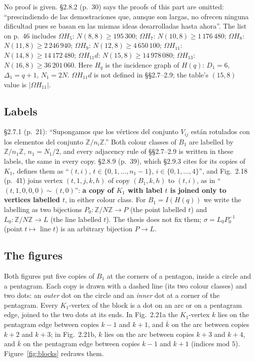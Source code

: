\documentclass[11pt]{amsart}
\theoremstyle{plain}
\theoremstyle{definition}
\theoremstyle{remark}
\newcommand{\bk}[1]{\overline{#1}}
\newcommand{\Om}{\Omega}
\newcommand{\pP}{P}  %
\newcommand{\lL}{L}  %
\begin{document}
No proof is given. \S2.8.2 (p.~30) says the proofs of this part are omitted: ``prescindiendo de las demostraciones que,
aunque son largas, no ofrecen ninguna dificultad pues se basan en las mismas ideas desarrolladas hasta ahora''. The list
on p.~46 includes $\Om H_5$: $N(8,8) \ge 195\,300$; $\Om H_7$: $N(10,8) \ge 1\,176\,480$; $\Om H_8$:
$N(11,8) \ge 2\,246\,940$; $\Om H_9$: $N(12,8) \ge 4\,650\,100$; $\Om H_{11}$: $N(14,8) \ge 14\,172\,480$;
$\Om H_{11}d$: $N(15,8) \ge 14\,978\,080$; $\Om H_{13}$: $N(16,8) \ge 36\,201\,060$. Here $H_q$ is the incidence graph
of $H(q)$: $D_1 = 6$, $\Delta_1 = q+1$, $N_1 = 2N$. $\Om H_{11}d$ is not defined in \S\S2.7--2.9; the table's $(15,8)$
value is $|\Om H_{11}|$.

\subsection{Labels}
\S2.7.1 (p.~21): ``Supongamos que los vértices del conjunto $V_{ij}$ están rotulados con los elementos del conjunto
$\mathbb{Z}/n_i\mathbb{Z}$.'' Both colour classes of $B_1$ are labelled by $\mathbb{Z}/n_1\mathbb{Z}$, $n_1 = N_1/2$, and
every adjacency rule of \S\S2.7--2.9 is written in these labels, the same in every copy. \S2.8.9 (p.~39), which
\S2.9.3 cites for its copies of $K_1$, defines them as ``$(t,i)$, $t \in \{0, 1, \dots, n_1 - 1\}$,
$i \in \{0, 1, \dots, 4\}$'', and Fig.~2.18 (p.~41) joins vertex $(t,1,j,k,h)$ of copy $(B_1,k,h)$ to $(t,i)$, as in
``$(t,1,0,0,0) \sim (t,0)$'': \textbf{a copy of $K_1$ with label $t$ is joined only to vertices labelled $t$}, in either
colour class. For $B_1 = I(H(q))$ we write the labelling as two bijections $P_0\colon \mathbb{Z}/N\mathbb{Z} \to \pP$ (the
point labelled $t$) and $L_0\colon \mathbb{Z}/N\mathbb{Z} \to \lL$ (the line labelled $t$). The thesis does not fix them;
$\sigma = L_0P_0^{-1}$ (point $t \mapsto$ line $t$) is an arbitrary bijection $\pP \to \lL$.

\subsection{The figures}
Both figures put five copies of $B_1$ at the corners of a pentagon, inside a circle and a pentagram. Each copy is drawn
with a dashed line (its two colour classes) and two dots: an \emph{outer} dot on the circle and an \emph{inner} dot at a
corner of the pentagram. Every $K_1$-vertex of the block is a dot on an arc or on a pentagram edge, joined to the two dots
at its ends. In Fig.~2.21a the $K_1$-vertex $k$ lies on the pentagram edge between copies $k-1$ and $k+1$, and $\bk k$ on
the arc between copies $k+2$ and $k+3$; in Fig.~2.21b, $k$ lies on the arc between copies $k+3$ and $k+4$, and $\bk k$ on
the pentagram edge between copies $k-1$ and $k+1$ (indices mod $5$). Figure~\ref{fig:blocks} redraws them.
\end{document}
